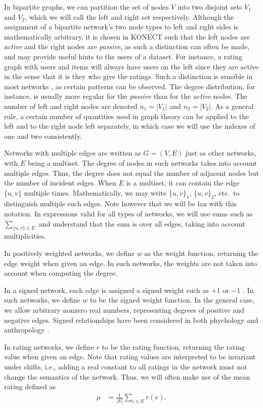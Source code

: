 \documentclass{article}
\begin{document}
In bipartite graphs, we can partition the set of nodes $V$ into two
disjoint sets $V_1$ and $V_2$, which we will call the left and right
set respectively.  Although the assignment of a bipartite network's two
node types to left and right sides is mathematically arbitrary, it is
chosen in KONECT such that the left nodes are \emph{active} and the
right nodes are \emph{passive}, as such a distinction can often be made,
and may provide useful hints to the users of a dataset.  For instance, a rating graph with users
and items will always have users on the left since they are active in
the sense that it is they who give the ratings. 
Such a distinction is sensible in most networks \citep{b732}, as certain
patterns can be observed.  The degree distribution, for instance, is
usually more regular for the \emph{passive} than for the \emph{active} nodes.
The number of left and
right nodes are denoted $n_1 = |V_1|$ and $n_2 = |V_2|$.  As a general
rule, a certain number of quantities used in graph theory can be applied
to the left and to the right node left separately, in which case we will
use the indexes of one and two consistently. 

Networks with multiple edges are written as $G=(V,E)$ just as other networks, with $E$ being
a multiset.  The degree of nodes in such networks takes into account
multiple edges.  Thus, the degree does not equal the number of adjacent
nodes but the number of incident edges.  When $E$ is a multiset, it can
contain the edge $\{u,v\}$ multiple times.  Mathematically, we 
may write $\{u,v\}_1$, $\{u,v\}_2$, etc.\ to distinguish multiple such
edges.   Note however that we will be lax with
this notation.  In expressions valid for all types of networks, we will
use sums such as $\sum_{\{u,v\}\in E}$ and understand that the sum
is over all edges, taking into account multiplicities. 

In positively weighted networks, we define $w$ as the
weight function, returning the edge weight when given an edge. In such
networks, the weights are not taken into account when computing the
degree. 

In a signed network, each edge is assigned a signed weight such as $+1$
or $-1$ \citep{b647}.  In such networks, we define $w$ to be the signed weight
function.  In the general case, we allow arbitrary nonzero real numbers,
representing degrees of positive and negative edges.  Signed
relationships have been considered in both phychology \citep{b862} and
anthropology \citep{b323}.  

In rating networks, we define $r$ to be
the rating function, returning the rating value when given an edge.  Note
that rating values are interpreted to be invariant under shifts, i.e.,
adding a real constant to all ratings in the network must not
change the semantics of the network.  Thus, we will often make use of
the mean rating defined as
\begin{align}
  \mu &= \frac 1 {|E|} \sum_{e\in E} r(e). 
\end{align}
\end{document}
